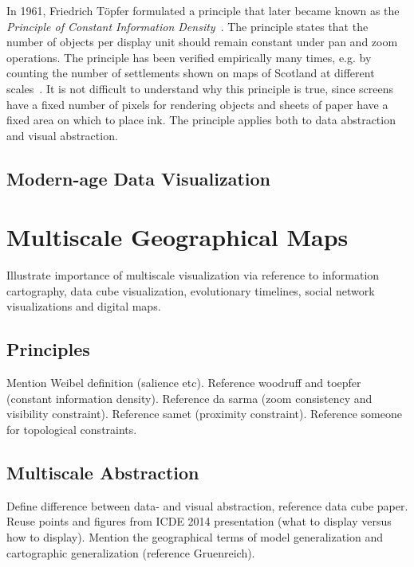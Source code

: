 \documentclass[11pt, oneside]{report}   	%
\begin{document}
In 1961, Friedrich T\"{o}pfer formulated a principle that later became known as the \emph{Principle of Constant Information Density}~\cite{woodruff1998constant}. The principle states that the number of objects per display unit should remain constant under pan and zoom operations. The principle has been verified empirically many times, e.g. by counting the number of settlements shown on maps of Scotland at different scales~\cite{topfer1966principles}. It is not difficult to understand why this principle is true, since screens have a fixed number of pixels for rendering objects and sheets of paper have a fixed area on which to place ink. The principle applies both to data abstraction and visual abstraction.


\section{Modern-age Data Visualization}

\chapter{Multiscale Geographical Maps}
Illustrate importance of multiscale visualization via reference to information cartography, data cube visualization, evolutionary timelines, social network visualizations and digital maps.

\section{Principles}
Mention Weibel definition (salience etc). Reference woodruff and toepfer (constant information density). Reference da sarma (zoom consistency and visibility constraint). Reference samet (proximity constraint). Reference someone for topological constraints.

\section{Multiscale Abstraction}
Define difference between data- and visual abstraction, reference data cube paper. Reuse points and figures from ICDE 2014 presentation (what to display versus how to display). Mention the geographical terms of model generalization and cartographic generalization (reference Gruenreich). 
\end{document}
